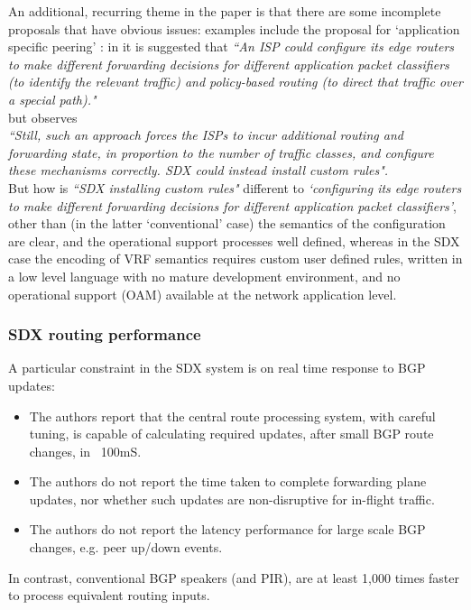 An additional, recurring theme in the paper is that there are some incomplete proposals that have obvious issues: examples include the proposal for `application specific peering' : in \cite{Gupta2014} 
it is suggested that
\emph{``An ISP could configure its edge routers to make different forwarding decisions for different application packet classifiers (to identify the relevant traffic) and policy-based routing (to direct that traffic over a special path)."}
\\but observes\\
\emph{``Still, such an approach forces the ISPs to incur additional routing and forwarding state, in proportion to the number of traffic classes, and configure these mechanisms correctly. SDX could instead install custom rules".}
\\But how is \emph{``SDX installing custom rules"} different to \emph{`configuring its edge routers to make different forwarding decisions for different application packet classifiers'}, other than (in the latter `conventional' case) the semantics of the configuration are clear, and the operational support processes well defined, whereas in the SDX case the encoding of VRF semantics requires custom user defined rules, written in a low level language with no mature development environment, and no operational support (OAM) available at the network application level.


\subsubsection{SDX routing performance}
A particular constraint in the SDX system is on real time response to BGP updates:
\begin{itemize}[noitemsep,nolistsep]
	\item{The authors report that the central route processing system, with careful tuning, is capable of calculating required updates, after small BGP route changes, in ~100mS.}
	\item{The authors do not report the time taken to complete forwarding plane updates, nor whether such updates are non-disruptive for in-flight traffic.}
	\item{The authors do not report the latency performance for large scale BGP changes, e.g. peer up/down events.}
\end{itemize}
In contrast, conventional BGP speakers (and PIR), are at least 1,000 times faster to process equivalent routing inputs.

